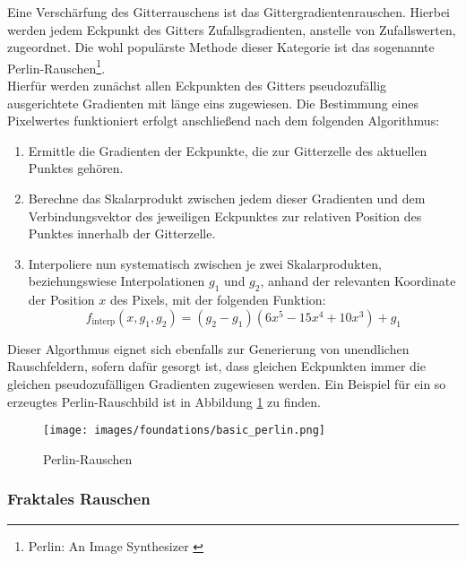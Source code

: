 Eine Verschärfung des Gitterrauschens ist das Gittergradientenrauschen. Hierbei werden jedem Eckpunkt des Gitters Zufallsgradienten, anstelle von Zufallswerten, zugeordnet. Die wohl populärste Methode dieser Kategorie ist das sogenannte Perlin-Rauschen\footnote{
    Perlin: An Image Synthesizer
    \cite{perlin1985image}
}. \\
Hierfür werden zunächst allen Eckpunkten des Gitters pseudozufällig ausgerichtete Gradienten mit länge eins zugewiesen. Die Bestimmung eines Pixelwertes funktioniert erfolgt anschließend nach dem folgenden Algorithmus:
\begin{enumerate}
    \item Ermittle die Gradienten der Eckpunkte, die zur Gitterzelle des aktuellen Punktes gehören.
    \item Berechne das Skalarprodukt zwischen jedem dieser Gradienten und dem Verbindungsvektor des jeweiligen Eckpunktes zur relativen Position des Punktes innerhalb der Gitterzelle.
    \item Interpoliere nun systematisch zwischen je zwei Skalarprodukten, beziehungswiese Interpolationen $g_1$ und $g_2$, anhand der relevanten Koordinate der Position $x$ des Pixels, mit der folgenden Funktion:
    \begin{equation}
        f_\text{interp}(x, g_1, g_2) = (g_2 - g_1)(6x^5 - 15x^4 + 10x^3) 
        + g_1
    \end{equation}
\end{enumerate}
Dieser Algorthmus eignet sich ebenfalls zur Generierung von unendlichen Rauschfeldern, sofern dafür gesorgt ist, dass gleichen Eckpunkten immer die gleichen pseudozufälligen Gradienten zugewiesen werden. Ein Beispiel für ein so erzeugtes Perlin-Rauschbild ist in Abbildung \ref{fig:basic_perlin} zu finden.
\begin{figure}[ht]
    \centering
    \texttt{[image: images/foundations/basic\_perlin.png]} 
    \caption{Perlin-Rauschen}
    \label{fig:basic_perlin}
\end{figure}


\subsubsection{Fraktales Rauschen}

